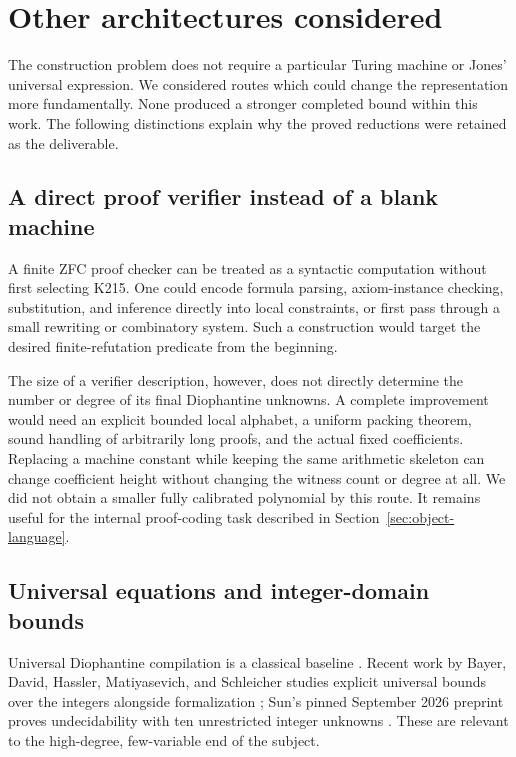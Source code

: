 \documentclass[11pt,a4paper]{article}
\theoremstyle{definition}
\begin{document}
\section{Other architectures considered}
\label{sec:alternatives}

The construction problem does not require a particular Turing machine
or Jones' universal expression.  We considered routes which could change
the representation more fundamentally.  None produced a stronger
completed bound within this work.  The following distinctions explain
why the proved reductions were retained as the deliverable.

\subsection{A direct proof verifier instead of a blank machine}

A finite ZFC proof checker can be treated as a syntactic computation
without first selecting K215.  One could encode formula parsing,
axiom-instance checking, substitution, and inference directly into
local constraints, or first pass through a small rewriting or
combinatory system.  Such a construction would target the desired
finite-refutation predicate from the beginning.

The size of a verifier description, however, does not directly determine
the number or degree of its final Diophantine unknowns.  A complete
improvement would need an explicit bounded local alphabet, a uniform
packing theorem, sound handling of arbitrarily long proofs, and the
actual fixed coefficients.  Replacing a machine constant while keeping
the same arithmetic skeleton can change coefficient height without
changing the witness count or degree at all.  We did not obtain a
smaller fully calibrated polynomial by this route.  It remains useful
for the internal proof-coding task described in
Section~\ref{sec:object-language}.

\subsection{Universal equations and integer-domain bounds}

Universal Diophantine compilation is a classical baseline
\cite{jones1982}.  Recent work by Bayer, David, Hassler, Matiyasevich,
and Schleicher studies explicit universal bounds over the integers
alongside formalization \cite{bayer2026}; Sun's pinned September 2026
preprint proves undecidability with ten unrestricted integer unknowns
\cite{sun2026}.  These are relevant to the high-degree, few-variable
end of the subject.
\end{document}

